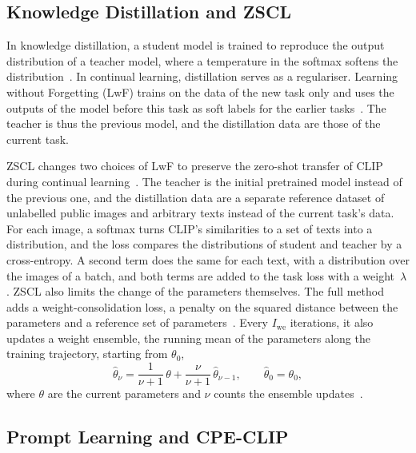 \subsection{Knowledge Distillation and ZSCL}
\label{subsec:bg-zscl}

In knowledge distillation, a student model is trained to reproduce the output distribution of a teacher model, where a temperature in the softmax softens the distribution~\cite[Sec.~2]{hinton2015distilling}.
In continual learning, distillation serves as a regulariser.
Learning without Forgetting (LwF) trains on the data of the new task only and uses the outputs of the model before this task as soft labels for the earlier tasks~\cite{li2017learningforgetting}.
The teacher is thus the previous model, and the distillation data are those of the current task.

ZSCL changes two choices of LwF to preserve the zero-shot transfer of CLIP~\cite{radford2021learningtransferablevisualmodels} during continual learning~\cite[Sec.~3.2, Eqs.~2--4]{zheng2023preventingzeroshottransferdegradation}.
The teacher is the initial pretrained model instead of the previous one, and the distillation data are a separate reference dataset of unlabelled public images and arbitrary texts instead of the current task's data.
For each image, a softmax turns CLIP's similarities to a set of texts into a distribution, and the loss compares the distributions of student and teacher by a cross-entropy.
A second term does the same for each text, with a distribution over the images of a batch, and both terms are added to the task loss with a weight~$\lambda$.
ZSCL also limits the change of the parameters themselves.
The full method adds a weight-consolidation loss, a penalty on the squared distance between the parameters and a reference set of parameters~\cite[Sec.~3.3, Eq.~5, Table~2]{zheng2023preventingzeroshottransferdegradation}.
Every $I_{\mathrm{we}}$ iterations, it also updates a weight ensemble, the running mean of the parameters along the training trajectory, starting from $\theta_0$,
\begin{equation}
\hat{\theta}_\nu = \frac{1}{\nu+1}\,\theta + \frac{\nu}{\nu+1}\,\hat{\theta}_{\nu-1}, \qquad \hat{\theta}_0 = \theta_0,
\label{eq:bg-we}
\end{equation}
where $\theta$ are the current parameters and $\nu$ counts the ensemble updates~\cite[Sec.~3.3, Eq.~7]{zheng2023preventingzeroshottransferdegradation}.

\subsection{Prompt Learning and CPE-CLIP}
\label{subsec:bg-prompt}

